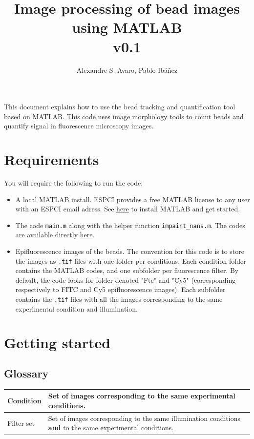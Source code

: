 \documentclass[a4paper]{article}
\begin{document}
\title{Image processing of bead images using MATLAB \\
\large{v0.1}}
\author{Alexandre S. Avaro, Pablo Ibáñez}
\maketitle

This document explains how to use the bead tracking and quantification tool based on MATLAB. This code uses image morphology tools to count beads and quantify signal in fluorescence microscopy images. 

\section{Requirements}
You will require the following to run the code:
\begin{itemize}
    \item A local MATLAB install. ESPCI provides a free MATLAB license to any user with an ESPCI email adress. See \href{https://www.mathworks.com/academia/tah-portal/espci-30728296.html}{here} to install MATLAB and get started.
    \item The code \verb|main.m| along with the helper function \verb|impaint_nans.m|. The codes are available directly \href{https://github.com/alexandre-avaro/bead-tracking}{here}.
    \item Epifluorescence images of the beads. The convention for this code is to store the images as \verb|.tif| files with one folder per conditions. Each condition folder contains the MATLAB codes, and one subfolder per fluorescence filter. By default, the code looks for folder denoted "Ftc" and "Cy5" (corresponding respectively to FITC and Cy5 epifluorescence images). Each subfolder contains the \verb|.tif| files with all the images corresponding to the same experimental condition and illumination.
\end{itemize}

\section{Getting started}
\subsection{Glossary}

\begin{tabular}{l|l}
    Condition & Set of images corresponding to the same experimental conditions. \\
    \hline
    Filter set & Set of images corresponding to the same illumination conditions \textbf{and} to the same experimental conditions. 
\end{tabular}
\end{document}
